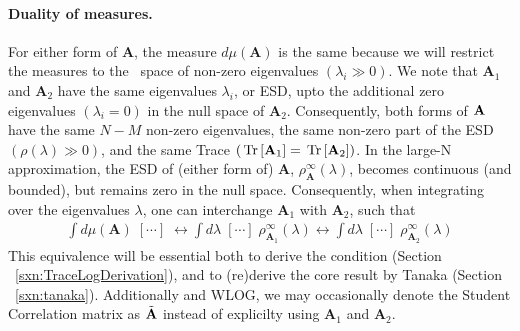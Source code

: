 \paragraph{Duality of measures.}
For either form of $\mathbf{A}$, the measure $d\mu(\mathbf{A})$ is the same because we will restrict the measures to the~\ECS
space of non-zero eigenvalues $(\lambda_{i}\gg 0)$.
We note that $\mathbf{A}_{1}$ and $\mathbf{A}_{2}$ have the same eigenvalues $\lambda_{i}$, or ESD,
upto the additional zero eigenvalues $(\lambda_{i}=0)$ in the null space of $\mathbf{A}_{2}$.  
Consequently, both forms of $\mathbf{A}$ have the same $N-M$ non-zero eigenvalues, the same non-zero part
of the ESD $(\rho(\lambda)\gg 0)$, and the same Trace $(\mbox{}\operatorname{Tr}\left[\mathbf{A}_{1}\right]=\mbox{}\operatorname{Tr}\left[\mathbf{A}_{2}\right])$.
In the large-N approximation, the ESD of (either form of)
$\mathbf{A}$, $\rho^{\infty}_{\mathbf{A}}(\lambda)$,
becomes continuous (and bounded), but remains zero in the null space.
Consequently,
when integrating over the eigenvalues  $\lambda$, one can interchange
$\mathbf{A}_1$  with $\mathbf{A}_2$, such that
\begin{align}
 \int d\mu(\mathbf{A})\;[\cdots]\;\leftrightarrow  \int d\lambda\;[\cdots]\; \rho^{\infty}_{\mathbf{A}_1}(\lambda) \leftrightarrow  \int d\lambda\;[\cdots]\; \rho^{\infty}_{\mathbf{A}_2}(\lambda)
\end{align}
This equivalence will be essential both to derive the \TRACELOG condition (Section ~\ref{sxn:TraceLogDerivation}),
and to (re)derive the core result by Tanaka (Section ~\ref{sxn:tanaka}).
Additionally and WLOG, we may occasionally denote the Student Correlation matrix as
$\tilde{\mathbf{A}}$ instead of explicilty using  $\mathbf{A}_{1}$ and $\mathbf{A}_{2}$.

